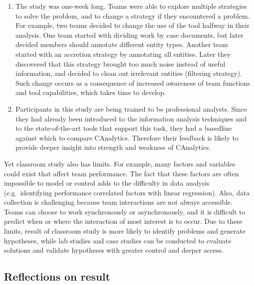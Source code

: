 \begin{enumerate}
	\def\labelenumi{\arabic{enumi}.}
	\item
	The study was one-week long. Teams were able to explore multiple
	strategies to solve the problem, and to change a strategy if they
	encountered a problem. For example, two teams decided to change the
	use of the tool halfway in their analysis. One team started with
	dividing work by case documents, but later decided members should
	annotate different entity types. Another team started with an
	accretion strategy by annotating all entities. Later they discovered
	that this strategy brought too much noise instead of useful
	information, and decided to clean out irrelevant entities (filtering
	strategy). Such change occurs as a consequence of increased awareness
	of team functions and tool capabilities, which takes time to develop.
	\item
	Participants in this study are being trained to be professional
	analysts. Since they had already been introduced to the
	information analysis techniques and to the state-of-the-art
	tools that support this task, they had a basedline against which to compare CAnalytics.  Therefore their feedback is
	likely to provide deeper insight into strength and weakness of
	CAnalytics.

\end{enumerate}

Yet classroom study also has limits. For example, many factors and
variables could exist that affect team performance. The fact that these
factors are often impossible to model or control adds to the difficulty
in data analysis (e.g.~identifying performance correlated factors with
linear regression). Also, data collection is challenging because team
interactions are not always accessible. Teams can choose to work
synchronously or asynchronously, and it is difficult to predict when or
where the interaction of most interest is to occur. Due to these limits,
result of classroom study is more likely to identify problems and
generate hypotheses, while lab studies and case studies can be conducted
to evaluate solutions and validate hypotheses with greater control and
deeper access.

\subsection{Reflections on result}\label{reflections-on-result}


